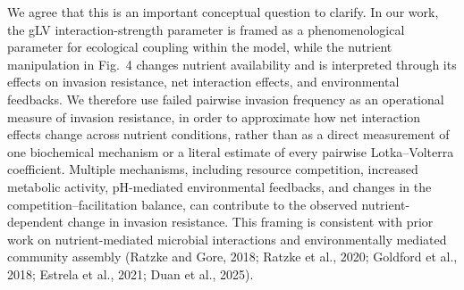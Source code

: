 \responselabel
We agree that this is an important conceptual question to clarify. In our work, the gLV interaction-strength parameter is framed as a phenomenological parameter for ecological coupling within the model, while the nutrient manipulation in Fig.~4 changes nutrient availability and is interpreted through its effects on invasion resistance, net interaction effects, and environmental feedbacks. We therefore use failed pairwise invasion frequency as an operational measure of invasion resistance, in order to approximate how net interaction effects change across nutrient conditions, rather than as a direct measurement of one biochemical mechanism or a literal estimate of every pairwise Lotka--Volterra coefficient. Multiple mechanisms, including resource competition, increased metabolic activity, pH-mediated environmental feedbacks, and changes in the competition--facilitation balance, can contribute to the observed nutrient-dependent change in invasion resistance. This framing is consistent with prior work on nutrient-mediated microbial interactions and environmentally mediated community assembly (Ratzke and Gore, 2018; Ratzke et al., 2020; Goldford et al., 2018; Estrela et al., 2021; Duan et al., 2025).


